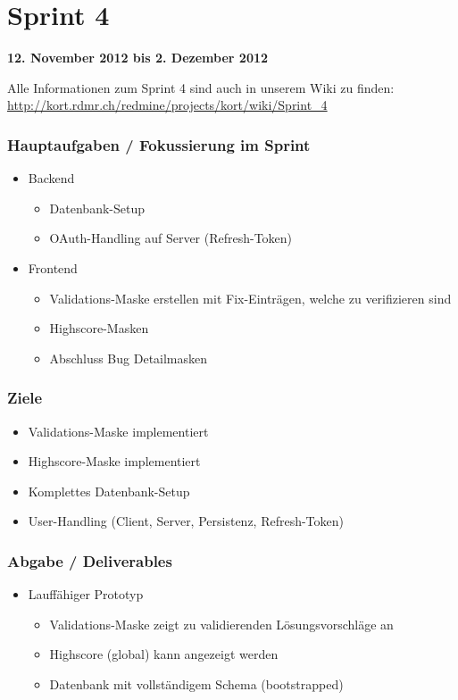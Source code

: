 \section{Sprint 4}

\textbf{12. November 2012 bis 2. Dezember 2012}

Alle Informationen zum Sprint 4 sind auch in unserem Wiki zu finden:
\url{http://kort.rdmr.ch/redmine/projects/kort/wiki/Sprint_4}

\subsubsection{Hauptaufgaben / Fokussierung im Sprint}

\begin{itemize}
	\item Backend
	\begin{itemize}
		\item Datenbank-Setup
		\item OAuth-Handling auf Server (Refresh-Token)
	\end{itemize}
	\item Frontend
	\begin{itemize}
		\item Validations-Maske erstellen mit Fix-Einträgen, welche zu verifizieren sind
		\item Highscore-Masken
		\item Abschluss Bug Detailmasken
	\end{itemize}
\end{itemize}

\subsubsection{Ziele}
\begin{itemize}
	\item Validations-Maske implementiert
	\item Highscore-Maske implementiert
	\item Komplettes Datenbank-Setup
	\item User-Handling (Client, Server, Persistenz, Refresh-Token)
\end{itemize}

\subsubsection{Abgabe / Deliverables}

\begin{itemize}
	\item Lauffähiger Prototyp
	\begin{itemize}
		\item Validations-Maske zeigt zu validierenden Lösungsvorschläge an
		\item Highscore (global) kann angezeigt werden
		\item Datenbank mit vollständigem Schema (bootstrapped)
	\end{itemize}
\end{itemize}

